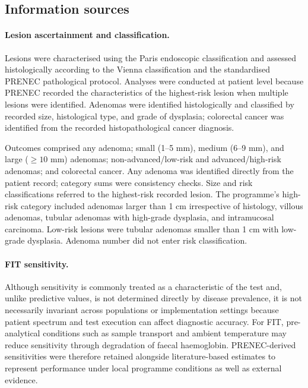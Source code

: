 \documentclass[10pt,a4paper]{article}
\begin{document}
\subsection*{Information sources}
\paragraph{Lesion ascertainment and classification.}
Lesions were characterised using the Paris endoscopic classification and assessed histologically according to the Vienna classification and the standardised PRENEC pathological protocol\cite{Paris2003,Vienna2000,Ito2016,Okada2016}. Analyses were conducted at patient level because PRENEC recorded the characteristics of the highest-risk lesion when multiple lesions were identified. Adenomas were identified histologically and classified by recorded size, histological type, and grade of dysplasia; colorectal cancer was identified from the recorded histopathological cancer diagnosis.

Outcomes comprised any adenoma; small (1--5 mm), medium (6--9 mm), and large ($\geq10$ mm) adenomas; non-advanced/low-risk and advanced/high-risk adenomas; and colorectal cancer. Any adenoma was identified directly from the patient record; category sums were consistency checks. Size and risk classifications referred to the highest-risk recorded lesion. The programme's high-risk category included adenomas larger than 1 cm irrespective of histology, villous adenomas, tubular adenomas with high-grade dysplasia, and intramucosal carcinoma. Low-risk lesions were tubular adenomas smaller than 1 cm with low-grade dysplasia. Adenoma number did not enter risk classification.

\paragraph{FIT sensitivity.}
Although sensitivity is commonly treated as a characteristic of the test and, unlike predictive values, is not determined directly by disease prevalence, it is not necessarily invariant across populations or implementation settings because patient spectrum and test execution can affect diagnostic accuracy.\cite{Cohen2016} For FIT, pre-analytical conditions such as sample transport and ambient temperature may reduce sensitivity through degradation of faecal haemoglobin.\cite{Doubeni2016} PRENEC-derived sensitivities were therefore retained alongside literature-based estimates to represent performance under local programme conditions as well as external evidence.
\end{document}
